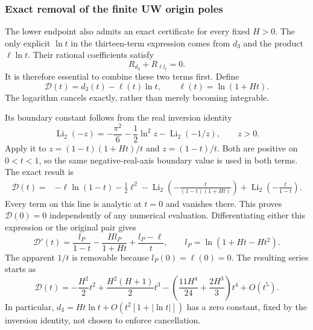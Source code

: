 \subsubsection{Exact removal of the finite UW origin poles}
\label{sec:comp-UW-lower-certificate}
The lower endpoint also admits an exact certificate for every fixed
$H>0$.  The only explicit $\ln t$ in the thirteen-term expression comes
from $d_3$ and the product $\ell\ln t$.  Their rational coefficients
satisfy
\begin{equation}
 R_{d_3}+R_{\ell l_t}=0.
\end{equation}
It is therefore essential to combine these two terms first.  Define
\begin{equation}
 \mathcal D(t)=d_3(t)-\ell(t)\ln t,\qquad \ell(t)=\ln(1+Ht).
\end{equation}
The logarithm cancels exactly, rather than merely becoming integrable.

Its boundary constant follows from the real inversion identity
\begin{equation}
 \operatorname{Li}_2(-z)=-\frac{\pi^2}{6}-\frac12\ln^2z
                              -\operatorname{Li}_2(-1/z),\qquad z>0.
\end{equation}
Apply it to $z=(1-t)(1+Ht)/t$ and $z=(1-t)/t$.  Both are positive on
$0<t<1$, so the same negative-real-axis boundary value is used in both
terms.  The exact result is
\begin{align}
 \mathcal D(t)={}&-\ell\ln(1-t)-\frac12\ell^2
 -\operatorname{Li}_2\!\left(-\frac{t}{(1-t)(1+Ht)}\right)
 +\operatorname{Li}_2\!\left(-\frac{t}{1-t}\right).
\end{align}
Every term on this line is analytic at $t=0$ and vanishes there.
This proves $\mathcal D(0)=0$ independently of any numerical evaluation.
Differentiating either this expression or the original pair gives
\begin{equation}
 \mathcal D'(t)=\frac{l_P}{1-t}-\frac{Hl_P}{1+Ht}
                         +\frac{l_P-\ell}{t},\qquad
 l_P=\ln(1+Ht-Ht^2).
\end{equation}
The apparent $1/t$ is removable because $l_P(0)=\ell(0)=0$.
The resulting series starts as
\begin{equation}
 \mathcal D(t)=-\frac{H^2}{2}t^2
 +\frac{H^2(H+1)}2t^3
 -\left(\frac{11H^4}{24}+\frac{2H^3}{3}\right)t^4+O(t^5).
\end{equation}
In particular, $d_3=Ht\ln t+O(t^2[1+|\ln t|])$ has a zero constant,
fixed by the inversion identity, not chosen to enforce cancellation.

